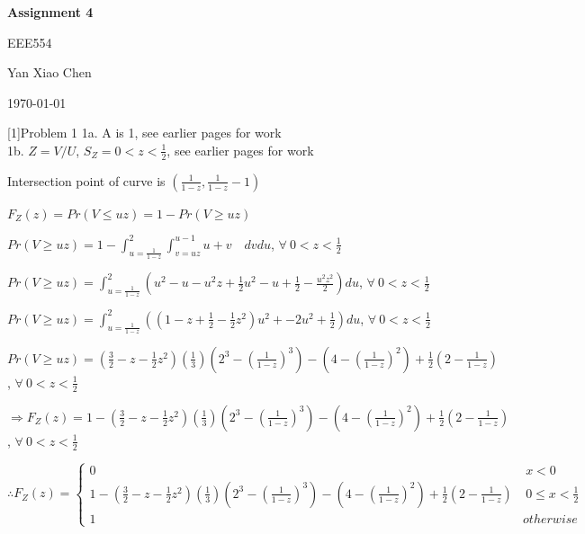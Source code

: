 \documentclass{article} %
\newcommand{\question}[2][]{\begin{flushleft}
        \textbf{Question #1}: \textit{#2}

\end{flushleft}}
\newcommand{\maketitletwo}[2][]{\begin{center}
        \Large{\textbf{Assignment #1}
            
            EEE554} %
        \vspace{5pt}
        
        \normalsize{Yan Xiao Chen  %
        
        \today}        %
        \vspace{15pt}
        
\end{center}}
\begin{document}
    \maketitletwo[4]  %

    \question[1]{Problem 1} 
    1a. A is 1, see earlier pages for work \\
    1b. $Z = V/U$, $S_Z=0 < z < \frac{1}{2}$, see earlier pages for work

    Intersection point of curve is $(\frac{1}{1-z},\frac{1}{1-z}-1)$
    
    $F_Z(z)=Pr(V \leq uz)= 1 - Pr(V \geq uz)$

    $Pr(V \geq uz)=1-\int_{u=\frac{1}{1-z}}^{2} \int_{v=uz}^{u-1}u+v \quad dv du$, $\forall \ 0<z<\frac{1}{2}$

    $Pr(V \geq uz)=\int_{u=\frac{1}{1-z}}^{2}(u^2-u-u^2z+\frac{1}{2}u^2-u+\frac{1}{2}-\frac{u^2z^2}{2})du$, $\forall \ 0<z<\frac{1}{2}$

    $Pr(V \geq uz)=\int_{u=\frac{1}{1-z}}^{2}((1-z+\frac{1}{2}-\frac{1}{2}z^2)u^2+-2u^2+\frac{1}{2})du$, $\forall \ 0<z<\frac{1}{2}$

    $Pr(V \geq uz)=(\frac{3}{2}-z-\frac{1}{2}z^2)(\frac{1}{3})(2^3-(\frac{1}{1-z})^3)-(4-(\frac{1}{1-z})^2)+\frac{1}{2}(2-\frac{1}{1-z})$, $\forall \ 0<z<\frac{1}{2}$
    
    $\Rightarrow F_Z(z)=1-(\frac{3}{2}-z-\frac{1}{2}z^2)(\frac{1}{3})(2^3-(\frac{1}{1-z})^3)-(4-(\frac{1}{1-z})^2)+\frac{1}{2}(2-\frac{1}{1-z})$, $\forall \ 0<z<\frac{1}{2}$

    $\therefore F_Z(z) = \left\{ \begin{array}{cl}
        0  &  \ x < 0 \\
        1-(\frac{3}{2}-z-\frac{1}{2}z^2)(\frac{1}{3})(2^3-(\frac{1}{1-z})^3)-(4-(\frac{1}{1-z})^2)+\frac{1}{2}(2-\frac{1}{1-z}) &  \ 0 \leq x < \frac{1}{2} \\
        1  &  otherwise 
        \end{array} \right.$
    
\end{document}
